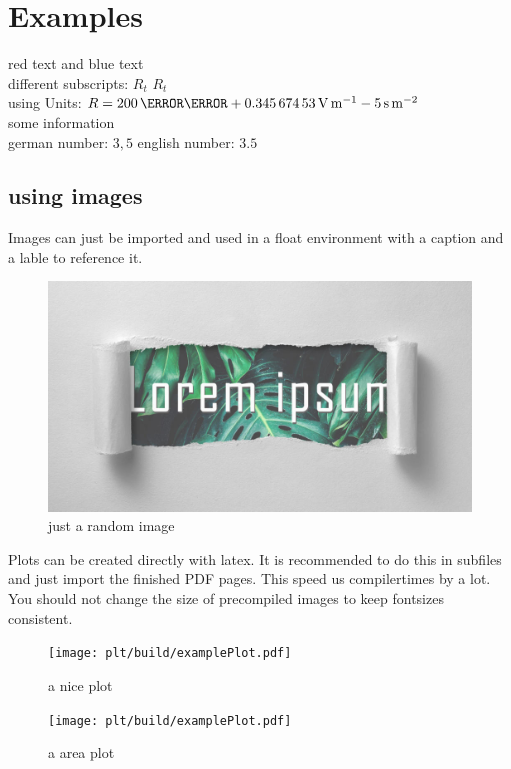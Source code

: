 \documentclass[	%
		11pt,a4paper,	%
		twoside,		%
		english,		%
		f1				%
	]{HsH-report}		%
\begin{document}
\maketitle				%
\declarationAuthorship

\begin{abstract}
	\lipsum[5-8]
\end{abstract}

\tableofcontents

\cleardoublepage %

\chapter{Examples}
	\label{chap: one}
	{\color{red}red text} and {\color{blue}blue text} \\
	different subscripts: \normalsubscripts$R_t$ \upsubscripts$R_t$ \\
	using Units: $R=200\,\milli\ohm + \SI{0.34567453}{\volt\per\metre} - 5\,\si{\second\per\metre\squared}$ \\
	some information\cite{laboranleitung:physik}\\
	german number: $3,5$ english number: $3.5$\\ %

	\section{using images}
	Images can just be imported and used in a float environment with a caption and a lable to reference it.
	\begin{figure}
		\includegraphics[width=.6\textwidth]{img/lorem-ipsum.jpg}
		\caption{just a random image}
	\end{figure}

	Plots can be created directly with latex. It is recommended to do this in subfiles and just import the finished PDF pages. This speed us
	compilertimes by a lot. You should not change the size of precompiled images to keep fontsizes consistent.
	\pagebreak
	\begin{figure}
		\texttt{[image: plt/build/examplePlot.pdf]}
		\caption[centering]{a nice plot}
		\label{fig: plot1}
	\end{figure}
	\begin{figure}
		\texttt{[image: plt/build/examplePlot.pdf]}
		\caption{a area plot}
		\label{fig: area}
	\end{figure}
\end{document}
